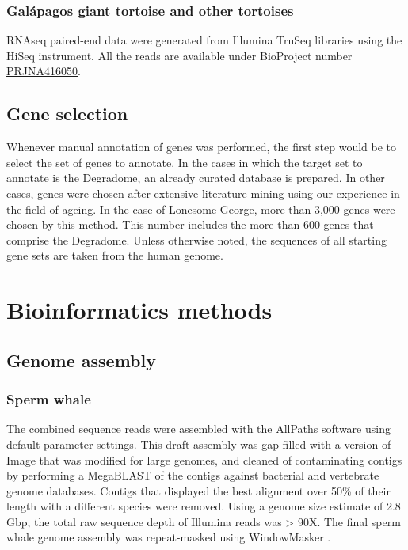\subsubsection*{Gal\'{a}pagos giant tortoise and other tortoises}

RNAseq paired-end data were generated from Illumina TruSeq libraries using the Hi\-Seq instrument.
All the reads are available under BioProject number \href{https://www.ncbi.nlm.nih.gov/bioproject/416050}{PRJNA416050}.

\subsection{Gene selection} \label{ss_matmet_molecular_gene_selection}

Whenever manual annotation of genes was performed, the first step would be to select the set of genes to annotate.
In the cases in which the target set to annotate is the Degradome, an already curated database is prepared.
In other cases, genes were chosen after extensive literature mining using our experience in the field of ageing.
In the case of Lonesome George, more than 3,000 genes were chosen by this method.
This number includes the more than 600 genes that comprise the Degradome.
Unless otherwise noted, the sequences of all starting gene sets are taken from the human genome.

\section{Bioinformatics methods} \label{s_matmet_bioinformatics}

\subsection{Genome assembly} \label{ss_matmet_bioinformatics_genome_assembly}

\subsubsection*{Sperm whale}

The combined sequence reads were assembled with the AllPaths software \cite{Butler2008} using default parameter settings.
This draft assembly was gap-filled with a version of Image \cite{Tsai2010} that was modified for large genomes, and cleaned of contaminating contigs by performing a MegaBLAST \cite{Zhang2000} of the contigs against bacterial and vertebrate genome databases.
Contigs that displayed the best alignment over 50\% of their length with a different species were removed.
Using a genome size estimate of 2.8 Gbp, the total raw sequence depth of Illumina reads was > 90X.
The final sperm whale genome assembly was repeat-masked using WindowMasker \cite{Morgulis2006}.

